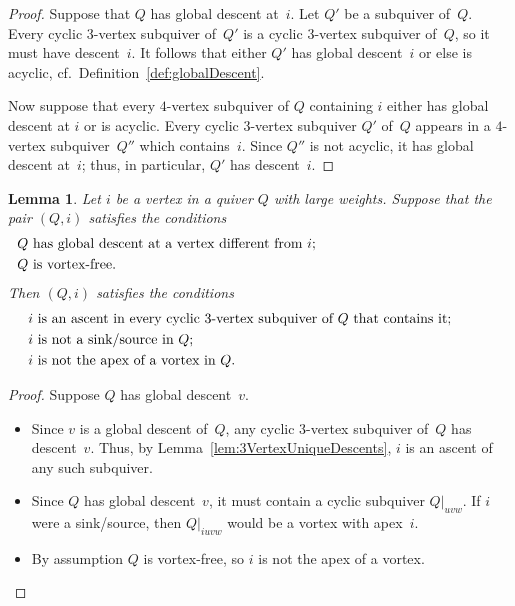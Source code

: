 \documentclass[11pt, letterpaper]{amsart}
\newtheorem{lemma}[theorem]{Lemma}
\theoremstyle{definition}
\numberwithin{equation}{section}
\begin{document}
\begin{proof}
Suppose that $Q$ has global descent at~$i$. Let $Q'$ be a subquiver of~$Q$. 
Every cyclic 3-vertex subquiver of~$Q'$ is a cyclic 3-vertex subquiver of~$Q$, so it must have descent~$i$. 
It follows that either $Q'$ has global descent~$i$ or else is acyclic, cf.\ Definition~\ref{def:globalDescent}. 

Now suppose that every $4$-vertex subquiver of $Q$ containing $i$ either has global descent at $i$ or is acyclic.
Every cyclic $3$-vertex subquiver $Q'$ of~$Q$ appears in a $4$-vertex subquiver~$Q''$ which contains~$i$. 
Since $Q''$ is not acyclic, it has global descent at~$i$; thus, in particular, $Q'$ has descent~$i$. 
\end{proof}

\begin{lemma}
\label{lem:strong=>weak}
Let $i$ be a vertex in a quiver $Q$ with large weights.
Suppose that the pair $(Q,i)$ satisfies the conditions 
\begin{align}
\label{eq:Q-global-descent}
&\text{$Q$ has global descent at a vertex different from~$i$; \hspace{1.8in}} \\
&\label{eq:Q-vortex-free}
\text{$Q$ is vortex-free.}
\end{align}
Then $(Q,i)$ satisfies the conditions 
\begin{align}
\label{eq:Q-ascent-3}
&\text{$i$ is an ascent in every cyclic 3-vertex subquiver of~$Q$ that contains it; \hspace{.35in}} \\
&\label{eq:Q-not-sink/source}
\text{$i$ is not a sink/source in~$Q$;}\\
&\label{eq:Q-not-apex}
\text{$i$ is not the apex of a vortex in~$Q$.}
\end{align}
\end{lemma}

\begin{proof}%
Suppose $Q$ has global descent~$v$.
\begin{itemize}[leftmargin=.42in]
\item[\eqref{eq:Q-ascent-3}:]
Since $v$ is a global descent of~$Q$, any cyclic 3-vertex subquiver of~$Q$ has descent~$v$. 
Thus, by Lemma~\ref{lem:3VertexUniqueDescents}, $i$ is an ascent of any such subquiver. 
\item[\eqref{eq:Q-not-sink/source}:]
Since $Q$ has global descent~$v$, it must contain a cyclic subquiver $Q|_{uvw}$. 
If $i$ were a sink/source, then $Q|_{iuvw}$ would be a vortex with apex~$i$. 
\item[\eqref{eq:Q-not-apex}:]
By assumption $Q$ is vortex-free, so $i$ is not the apex of a vortex. \qedhere
\end{itemize}
\end{proof}
\end{document}
